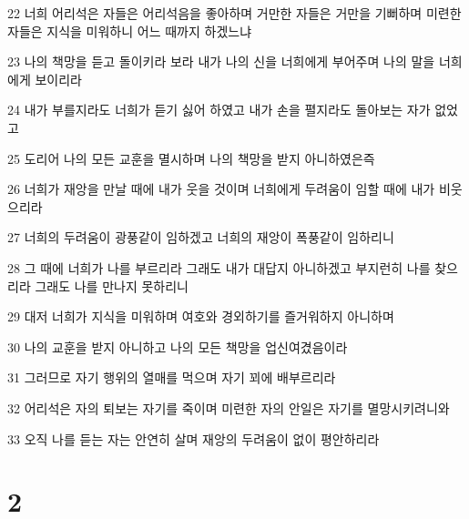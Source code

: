 \par 22 너희 어리석은 자들은 어리석음을 좋아하며 거만한 자들은 거만을 기뻐하며 미련한 자들은 지식을 미워하니 어느 때까지 하겠느냐
\par 23 나의 책망을 듣고 돌이키라 보라 내가 나의 신을 너희에게 부어주며 나의 말을 너희에게 보이리라
\par 24 내가 부를지라도 너희가 듣기 싫어 하였고 내가 손을 펼지라도 돌아보는 자가 없었고
\par 25 도리어 나의 모든 교훈을 멸시하며 나의 책망을 받지 아니하였은즉
\par 26 너희가 재앙을 만날 때에 내가 웃을 것이며 너희에게 두려움이 임할 때에 내가 비웃으리라
\par 27 너희의 두려움이 광풍같이 임하겠고 너희의 재앙이 폭풍같이 임하리니
\par 28 그 때에 너희가 나를 부르리라 그래도 내가 대답지 아니하겠고 부지런히 나를 찾으리라 그래도 나를 만나지 못하리니
\par 29 대저 너희가 지식을 미워하며 여호와 경외하기를 즐거워하지 아니하며
\par 30 나의 교훈을 받지 아니하고 나의 모든 책망을 업신여겼음이라
\par 31 그러므로 자기 행위의 열매를 먹으며 자기 꾀에 배부르리라
\par 32 어리석은 자의 퇴보는 자기를 죽이며 미련한 자의 안일은 자기를 멸망시키려니와
\par 33 오직 나를 듣는 자는 안연히 살며 재앙의 두려움이 없이 평안하리라

\chapter{2}

